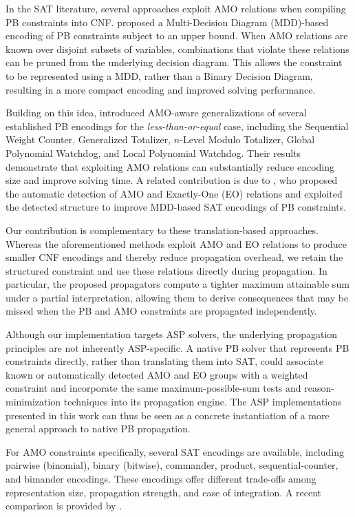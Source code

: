 \documentclass[preprint,authoryear]{elsarticle}
\theoremstyle{definition}
\begin{document}
{\color{blue}
In the SAT literature, several approaches exploit AMO relations when compiling PB constraints into CNF. \cite{DBLP:conf/ijcai/BofillCSV17} proposed a Multi-Decision Diagram (MDD)-based encoding of PB constraints subject to an upper bound. When AMO relations are known over disjoint subsets of variables, combinations that violate these relations can be pruned from the underlying decision diagram. This allows the constraint to be represented using a MDD, rather than a Binary Decision Diagram, resulting in a more compact encoding and improved solving performance.

Building on this idea, \cite{DBLP:journals/ai/BofillCNSUV22} introduced AMO-aware generalizations of several established PB encodings for the \textit{less-than-or-equal} case, including the Sequential Weight Counter, Generalized Totalizer, \(n\)-Level Modulo Totalizer, Global Polynomial Watchdog, and Local Polynomial Watchdog. Their results demonstrate that exploiting AMO relations can substantially reduce encoding size and improve solving time. A related contribution is due to \cite{DBLP:conf/cp/AnsoteguiBCDEMN19}, who proposed the automatic detection of AMO and Exactly-One (EO) relations and exploited the detected structure to improve MDD-based SAT encodings of PB constraints.

Our contribution is complementary to these translation-based approaches. Whereas the aforementioned methods exploit AMO and EO relations to produce smaller CNF encodings and thereby reduce propagation overhead, we retain the structured constraint and use these relations directly during propagation. In particular, the proposed propagators compute a tighter maximum attainable sum under a partial interpretation, allowing them to derive consequences that may be missed when the PB and AMO constraints are propagated independently.

Although our implementation targets ASP solvers, the underlying propagation principles are not inherently ASP-specific. A native PB solver that represents PB constraints directly, rather than translating them into SAT, could associate known or automatically detected AMO and EO groups with a weighted constraint and incorporate the same maximum-possible-sum tests and reason-minimization techniques into its propagation engine. The ASP implementations presented in this work can thus be seen as a concrete instantiation of a more general approach to native PB propagation.

For AMO constraints specifically, several SAT encodings are available, including pairwise (binomial), binary (bitwise), commander, product, sequential-counter, and bimander encodings. These encodings offer different trade-offs among representation size, propagation strength, and ease of integration. A recent comparison is provided by \cite{DBLP:conf/sma2/NguyenNKB20}.

}
\end{document}
